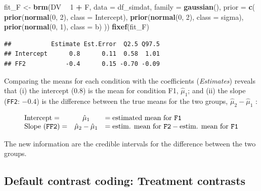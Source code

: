\documentclass[12pt,]{krantz}
\newenvironment{Shaded}{\begin{snugshade}}{\end{snugshade}}
\newcommand{\DataTypeTok}[1]{\textcolor[rgb]{0.13,0.29,0.53}{#1}}
\newcommand{\DecValTok}[1]{\textcolor[rgb]{0.00,0.00,0.81}{#1}}
\newcommand{\KeywordTok}[1]{\textcolor[rgb]{0.13,0.29,0.53}{\textbf{#1}}}
\newcommand{\NormalTok}[1]{#1}
\newcommand{\OperatorTok}[1]{\textcolor[rgb]{0.81,0.36,0.00}{\textbf{#1}}}
\newcommand{\StringTok}[1]{\textcolor[rgb]{0.31,0.60,0.02}{#1}}
\theoremstyle{definition}
\theoremstyle{definition}
\theoremstyle{definition}
\theoremstyle{remark}
\begin{document}
\begin{Shaded}
\begin{Highlighting}[]
\NormalTok{fit_F <-}\StringTok{ }\KeywordTok{brm}\NormalTok{(DV }\OperatorTok{~}\StringTok{ }\DecValTok{1} \OperatorTok{+}\StringTok{ }\NormalTok{F,}
                 \DataTypeTok{data =}\NormalTok{ df_simdat,}
                 \DataTypeTok{family =} \KeywordTok{gaussian}\NormalTok{(),}
                 \DataTypeTok{prior =} \KeywordTok{c}\NormalTok{(}
                     \KeywordTok{prior}\NormalTok{(}\KeywordTok{normal}\NormalTok{(}\DecValTok{0}\NormalTok{, }\DecValTok{2}\NormalTok{), }\DataTypeTok{class =}\NormalTok{ Intercept),}
                     \KeywordTok{prior}\NormalTok{(}\KeywordTok{normal}\NormalTok{(}\DecValTok{0}\NormalTok{, }\DecValTok{2}\NormalTok{), }\DataTypeTok{class =}\NormalTok{ sigma),}
                     \KeywordTok{prior}\NormalTok{(}\KeywordTok{normal}\NormalTok{(}\DecValTok{0}\NormalTok{, }\DecValTok{1}\NormalTok{), }\DataTypeTok{class =}\NormalTok{ b)}
\NormalTok{                 )) }
\KeywordTok{fixef}\NormalTok{(fit_F)}
\end{Highlighting}
\end{Shaded}

\begin{verbatim}
##           Estimate Est.Error  Q2.5 Q97.5
## Intercept      0.8      0.11  0.58  1.01
## FF2           -0.4      0.15 -0.70 -0.09
\end{verbatim}

Comparing the means for each condition with the coefficients (\emph{Estimates}) reveals that (i) the intercept (\(0.8\)) is the mean for condition F1, \(\hat\mu_1\); and (ii) the slope (\texttt{FF2}: \(-0.4\)) is the difference between the true means for the two groups, \(\hat\mu_2 - \hat\mu_1\) \citep{Bolker2018}:

\begin{equation}
\begin{array}{lcl}
\text{Intercept} = & \hat{\mu}_1 & = \text{estimated mean for \texttt{F1}} \\
\text{Slope (\texttt{FF2})} = & \hat{\mu}_2 - \hat{\mu}_1 & = \text{estim. mean for \texttt{F2}} - \text{estim. mean for \texttt{F1}} 
\end{array}
\label{def:beta}
\end{equation}

The new information are the credible intervals for the difference between the two groups.

\hypertarget{treatmentcontrasts}{%
\subsection{Default contrast coding: Treatment contrasts}\label{treatmentcontrasts}}
\end{document}
